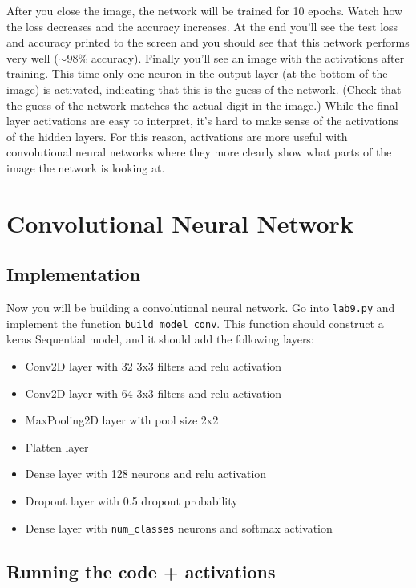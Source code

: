 \documentclass{article}
\begin{document}
After you close the image, the network will be trained for 10 epochs. Watch how the loss decreases and the accuracy increases. At the end you'll see the test loss and accuracy printed to the screen and you should see that this network performs very well ($\sim 98\%$ accuracy). Finally you'll see an image with the activations after training. This time only one neuron in the output layer (at the bottom of the image) is activated, indicating that this is the guess of the network. (Check that the guess of the network matches the actual digit in the image.) While the final layer activations are easy to interpret, it's hard to make sense of the activations of the hidden layers. For this reason, activations are more useful with convolutional neural networks where they more clearly show what parts of the image the network is looking at.

\section{Convolutional Neural Network}

\subsection{Implementation}

Now you will be building a convolutional neural network. Go into \texttt{lab9.py} and implement the function \texttt{build\_model\_conv}. This function should construct a keras Sequential model, and it should add the following layers:

\begin{itemize}
\item Conv2D layer with 32 3x3 filters and relu activation
\item Conv2D layer with 64 3x3 filters and relu activation
\item MaxPooling2D layer with pool size 2x2
\item Flatten layer
\item Dense layer with 128 neurons and relu activation
\item Dropout layer with 0.5 dropout probability
\item Dense layer with \texttt{num\_classes} neurons and softmax activation
\end{itemize}

\subsection{Running the code + activations}
\end{document}
